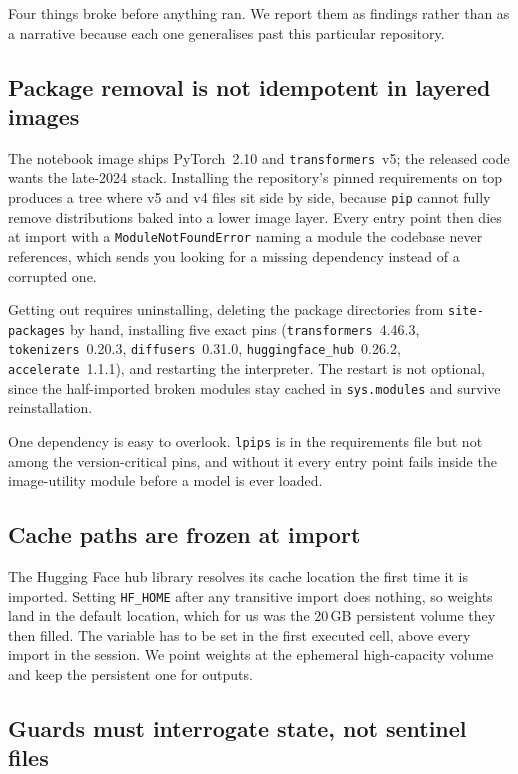 \documentclass[10pt,twocolumn]{article}
\newcommand{\code}[1]{\texttt{\small #1}}
\begin{document}
Four things broke before anything ran. We report them as findings rather than as a
narrative because each one generalises past this particular repository.

\subsection{Package removal is not idempotent in layered images}

The notebook image ships PyTorch~2.10 and \code{transformers}~v5; the released code
wants the late-2024 stack. Installing the repository's pinned requirements on top
produces a tree where v5 and v4 files sit side by side, because \code{pip} cannot
fully remove distributions baked into a lower image layer. Every entry point then dies
at import with a \code{ModuleNotFoundError} naming a module the codebase never
references, which sends you looking for a missing dependency instead of a corrupted
one.

Getting out requires uninstalling, deleting the package directories from
\code{site-packages} by hand, installing five exact pins
(\code{transformers}~4.46.3, \code{tokenizers}~0.20.3, \code{diffusers}~0.31.0,
\code{huggingface\_hub}~0.26.2, \code{accelerate}~1.1.1), and restarting the
interpreter. The restart is not optional, since the half-imported broken modules stay
cached in \code{sys.modules} and survive reinstallation.

One dependency is easy to overlook. \code{lpips} is in the requirements file but not
among the version-critical pins, and without it every entry point fails inside the
image-utility module before a model is ever loaded.

\subsection{Cache paths are frozen at import}

The Hugging Face hub library resolves its cache location the first time it is
imported. Setting \code{HF\_HOME} after any transitive import does nothing, so weights
land in the default location, which for us was the 20\,GB persistent volume they then
filled. The variable has to be set in the first executed cell, above every import in
the session. We point weights at the ephemeral high-capacity volume and keep the
persistent one for outputs.

\subsection{Guards must interrogate state, not sentinel files}
\end{document}
